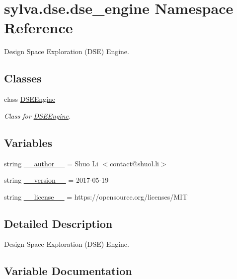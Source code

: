 \hypertarget{namespacesylva_1_1dse_1_1dse__engine}{}\section{sylva.\+dse.\+dse\+\_\+engine Namespace Reference}
\label{namespacesylva_1_1dse_1_1dse__engine}


Design Space Exploration (D\+SE) Engine.  


\subsection*{Classes}
\begin{DoxyCompactItemize}
\item 
class \hyperlink{classsylva_1_1dse_1_1dse__engine_1_1_d_s_e_engine}{D\+S\+E\+Engine}
\begin{DoxyCompactList}\small\item\em Class for \hyperlink{classsylva_1_1dse_1_1dse__engine_1_1_d_s_e_engine}{D\+S\+E\+Engine}. \end{DoxyCompactList}\end{DoxyCompactItemize}
\subsection*{Variables}
\begin{DoxyCompactItemize}
\item 
string \hyperlink{namespacesylva_1_1dse_1_1dse__engine_a99cfcebc27e19d9bf6b5ddde438b7fdc}{\+\_\+\+\_\+author\+\_\+\+\_\+} = \textquotesingle{}Shuo Li $<$contact@shuol.\+li$>$\textquotesingle{}
\item 
string \hyperlink{namespacesylva_1_1dse_1_1dse__engine_a853fb2c58d3b27a89da0b44de671fb88}{\+\_\+\+\_\+version\+\_\+\+\_\+} = \textquotesingle{}2017-\/05-\/19\textquotesingle{}
\item 
string \hyperlink{namespacesylva_1_1dse_1_1dse__engine_ae271471951ad558d45c1370add51cb8e}{\+\_\+\+\_\+license\+\_\+\+\_\+} = \textquotesingle{}https\+://opensource.\+org/licenses/M\+IT\textquotesingle{}
\end{DoxyCompactItemize}


\subsection{Detailed Description}
Design Space Exploration (D\+SE) Engine. 

\subsection{Variable Documentation}
\mbox{\label{namespacesylva_1_1dse_1_1dse__engine_a99cfcebc27e19d9bf6b5ddde438b7fdc}} 
